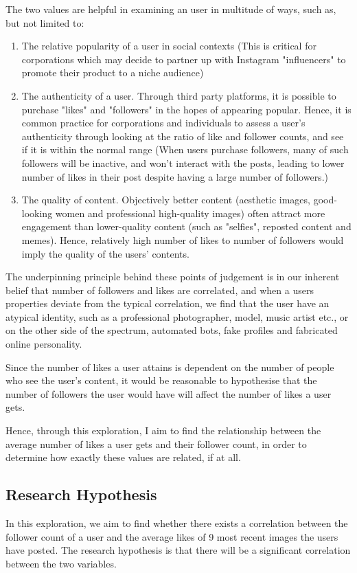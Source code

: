 \documentclass[11pt]{article}
\begin{document}
The two values are helpful in examining an user in multitude of ways, such as, but not limited to:
\begin{enumerate}  
\item The relative popularity of a user in social contexts (This is critical for corporations which may decide to partner up with Instagram "influencers" to promote their product to a niche audience)
\item The authenticity of a user. Through third party platforms, it is possible to purchase "likes" and "followers" in the hopes of appearing popular. Hence, it is common practice for corporations and individuals to assess a user's authenticity through looking at the ratio of like and follower counts, and see if it is within the normal range (When users purchase followers, many of such followers will be inactive, and won't interact with the posts, leading to lower number of likes in their post despite having a large number of followers.)
\item The quality of content. Objectively better content (aesthetic images, good-looking women and professional high-quality images) often attract more engagement than lower-quality content (such as "selfies", reposted content and memes). Hence, relatively high number of likes to number of followers would imply the quality of the users' contents.
\end{enumerate}

The underpinning principle behind these points of judgement is in our inherent belief that number of followers and likes are correlated, and when a users properties deviate from the typical correlation, we find that the user have an atypical identity, such as a professional photographer, model, music artist etc., or on the other side of the spectrum, automated bots, fake profiles and fabricated online personality.  

Since the number of likes a user attains is dependent on the number of people who see the user's content, it would be reasonable to hypothesise that the number of followers the user would have will affect the number of likes a user gets. 

Hence, through this exploration, I aim to find the relationship between the average number of likes a user gets and their follower count, in order to determine how exactly these values are related, if at all.

\subsection{Research Hypothesis}
In this exploration, we aim to find whether there exists a correlation between the follower count of a user and the average likes of 9 most recent images the users have posted. The research hypothesis is that there will be a significant correlation between the two variables.
\end{document}

